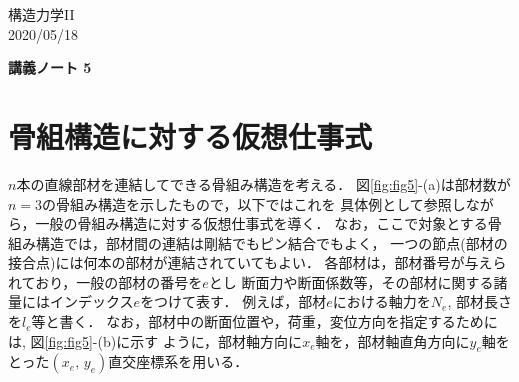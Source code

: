 \documentclass[10pt,a4j]{jarticle}
\newlength{\minitwocolumn}
\begin{document}
\newcommand{\fat}[1]{\mbox{\boldmath $#1$}}
\newcommand{\D}{\partial}
\newcommand{\w}{\omega}
\newcommand{\ga}{\alpha}
\newcommand{\gb}{\beta}
\newcommand{\gx}{\xi}
\newcommand{\gz}{\zeta}
\newcommand{\vhat}[1]{\hat{\fat{#1}}}
\newcommand{\spc}{\vspace{0.7\baselineskip}}
\newcommand{\halfspc}{\vspace{0.3\baselineskip}}

\newcommand{\twofig}[2]
 {
   \begin{figure}
     \begin{minipage}[t]{\minitwocolumn}
         \begin{center}   #1
         \end{center}
     \end{minipage}
         \hspace{\columnsep}
     \begin{minipage}[t]{\minitwocolumn}
         \begin{center} #2
         \end{center}
     \end{minipage}
   \end{figure}
 }
\begin{flushright}
	構造力学II\\
	2020/05/18
\end{flushright}
\begin{center}
	{\LARGE \bf 講義ノート 5} \\
\end{center}
\section{骨組構造に対する仮想仕事式}
$n$本の直線部材を連結してできる骨組み構造を考える．
図\ref{fig:fig5}-(a)は部材数が$n=3$の骨組み構造を示したもので，以下ではこれを
具体例として参照しながら，一般の骨組み構造に対する仮想仕事式を導く．
なお，ここで対象とする骨組み構造では，部材間の連結は剛結でもピン結合でもよく，
一つの節点(部材の接合点)には何本の部材が連結されていてもよい．
各部材は，部材番号が与えられており，一般の部材の番号を$e$とし
断面力や断面係数等，その部材に関する諸量にはインデックス$e$をつけて表す．
例えば，部材$e$における軸力を$N_e$, 部材長さを$l_e$等と書く．
なお，部材中の断面位置や，荷重，変位方向を指定するためには, 図\ref{fig:fig5}-(b)に示す
ように，部材軸方向に$x_e$軸を，部材軸直角方向に$y_e$軸をとった$(x_e,\,y_e)$直交座標系を用いる．
\end{document}
